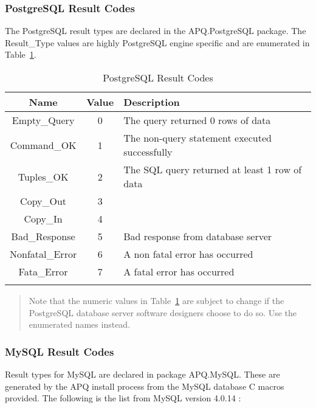 \documentclass[english,letterpaper]{book}
\begin{document}
\subsubsection{PostgreSQL Result Codes}

The PostgreSQL result types are declared in the APQ\-.PostgreSQL package.
The Result\_Type values are highly PostgreSQL engine specific and are
enumerated in Table~\ref{t:pqresc}.

\begin{longtable}{|c|c|l|}
\hline 
Name              &  Value          &  Description\\
\hline
Empty\_Query      &  0              &  The query returned 0 rows of data\\
Command\_OK       &  1              &  The non-query statement executed successfully\\
Tuples\_OK        &  2              &  The SQL query returned at least 1 row of data\\
Copy\_Out         &  3              &  \\
Copy\_In          &  4              &  \\
Bad\_Response     &  5              &  Bad response from database server\\
Nonfatal\_Error   &  6              &  A non fatal error has occurred\\
Fata\_Error       &  7              &  A fatal error has occurred\\
\hline
\caption{PostgreSQL Result Codes}\label{t:pqresc}
\end{longtable}

\begin{quote}
Note that the numeric values in Table~\ref{t:pqresc} are subject to change if the
PostgreSQL database server software designers choose to do so. Use
the enumerated names instead.
\end{quote}

\subsubsection{MySQL Result Codes}

Result types for MySQL are declared in package APQ\-.MySQL. These are
generated by the APQ install process from the MySQL database 
C macros provided. The following is the list from MySQL version 4.0.14 :
\end{document}
